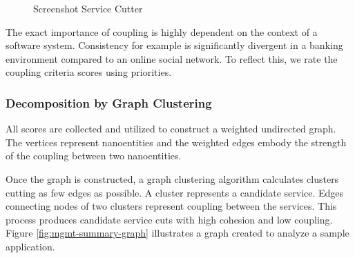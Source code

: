 \begin{figure}[H]
	\caption{Screenshot Service Cutter}
	\label{fig:ServiceCutter-mgmt-summary}
\end{figure}

The exact importance of coupling is highly dependent on the context of a software system. Consistency for example is significantly divergent in a banking environment compared to an online social network. To reflect this, we rate the coupling criteria scores using priorities.

\subsubsection{Decomposition by Graph Clustering}

All scores are collected and utilized to construct a weighted undirected graph. The vertices represent nanoentities and the weighted edges embody the strength of the coupling between two nanoentities.	

Once the graph is constructed, a graph clustering algorithm calculates clusters cutting as few edges as possible. A cluster represents a candidate service. Edges connecting nodes of two clusters represent coupling between the services. This process produces candidate service cuts with high cohesion and low coupling. Figure \ref{fig:mgmt-summary-graph} illustrates a graph created to analyze a sample application.

